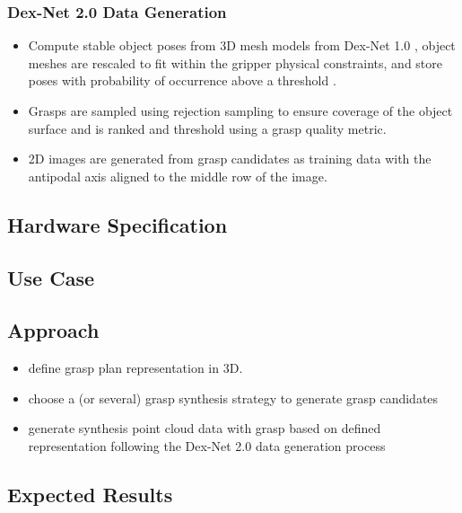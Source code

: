 \documentclass[12pt]{article}
\begin{document}
    \subsubsection{Dex-Net 2.0 Data Generation}
    \begin{itemize}
    	\item Compute stable object poses from 3D mesh models from Dex-Net 1.0 \cite{mahler2016}, object meshes are rescaled to fit within the gripper physical constraints, and store poses with probability of occurrence above a threshold .
    	\item Grasps are sampled using rejection sampling to ensure coverage of the object surface and is ranked and threshold using a grasp quality metric.
    	\item 2D images are generated from grasp candidates as training data with the antipodal axis aligned to the middle row of the image.
    \end{itemize}

	\subsection{Hardware Specification}

	\subsection{Use Case}

    \subsection{Approach}
	\begin{itemize}
		\item define grasp plan representation in 3D.
		\item choose a (or several) grasp synthesis strategy to generate grasp candidates
		\item generate synthesis point cloud data with grasp based on defined representation following the Dex-Net 2.0 data generation process \cite{mahler2017}
	\end{itemize}

    \subsection{Expected Results}
\end{document}
